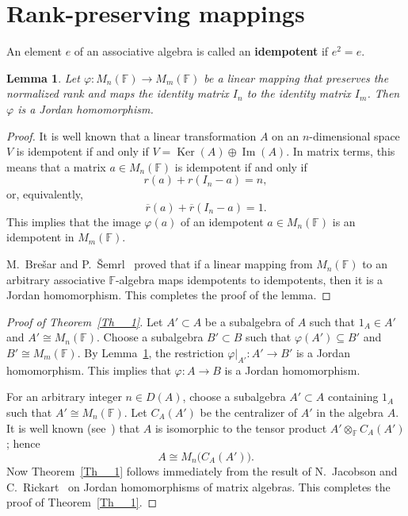 \documentclass[12pt]{amsart}
\newtheorem{lemma}{Lemma}
\begin{document}
{		\section{Rank-preserving mappings}
		


		
		An element $e$ of an associative algebra is called an \textbf{idempotent} 
		if $e^2 = e$.
		
	
	
	\begin{lemma}\label{Lem__1} 
	Let $\varphi \colon M_n(\mathbb{F}) \to M_m(\mathbb{F})$   be a linear
	mapping that preserves the normalized rank and maps the identity matrix $I_n$
	to the identity matrix $I_m$. Then $\varphi$ is a Jordan homomorphism.  \end{lemma}
	
	
	\begin{proof} It is well known that a linear transformation $A$ on an $n$-dimensional space  $V$ is idempotent if and only if $V = \operatorname{Ker}(A) \oplus  \operatorname{Im}(A).$ In matrix terms, this means that a matrix $a\in M_n(\mathbb{F}) $ is idempotent if and only if
	\[
	r(a)+r(I_n-a)=n,
	\]
	or, equivalently,
	\[
	\overline{r}(a)+\overline{r}(I_n-a)=1.
	\]
	This implies that the image $\varphi(a)$ of an idempotent $a\in M_n(\mathbb{F})$
	is an idempotent in $M_m(\mathbb{F})$.
	

	M.~Bre\v{s}ar and P.~\v{S}emrl~\cite{Bresar_00} proved that if a linear mapping from
	$M_n(\mathbb{F})$ to an arbitrary associative $\mathbb{F}$-algebra maps
	idempotents to idempotents, then it is a Jordan homomorphism.
	This completes the proof of the lemma.  \end{proof}
	
	

\begin{proof}[Proof of Theorem~\ref{Th__1}] 		Let $A' \subset A$ be a subalgebra of $A$ such that $1_A \in A'$ and $A' \cong M_n(\mathbb{F})$.
		Choose a subalgebra $B' \subset B$ such that $\varphi(A') \subseteq B'$ and $B' \cong M_m(\mathbb{F})$.
		By Lemma~\ref{Lem__1}, the restriction $\varphi|_{A'} \colon A' \to B'$ 
		is a Jordan homomorphism. This implies that 
		$\varphi \colon A \to B$ is a Jordan homomorphism.
		

For an arbitrary integer $n \in D(A)$, choose a subalgebra $A' \subset A$ containing  $1_A$ such that  $A' \cong M_n(\mathbb{F})$.	Let $C_A(A')$ be the centralizer of $A'$ in the algebra $A$. It is well known (see~\cite{Drozd_Kirichenko}) that $A$ is isomorphic
to the tensor product $A'\otimes_{\mathbb{F}} C_A(A')$; hence
\[
A\cong M_n\!\bigl(C_A(A')\bigr).
\]	Now Theorem~\ref{Th__1} follows immediately  from the result of N.~Jacobson and C.~Rickart~\cite{Jacobson2}
		on Jordan homomorphisms of matrix algebras.
		This completes the proof of Theorem~\ref{Th__1}. \end{proof}
		
}
\end{document}

